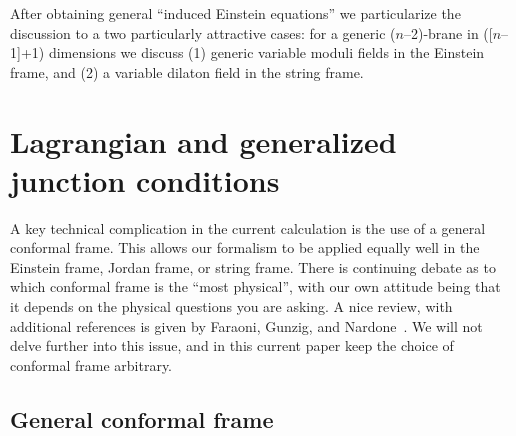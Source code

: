 \documentclass[a4paper,10pt]{article}
\begin{document}
After obtaining general ``induced Einstein equations'' we
particularize the discussion to a two particularly attractive cases:
for a generic ($n$--2)-brane in ([$n$--1]+1) dimensions we discuss (1)
generic variable moduli fields in the Einstein frame, and (2) a
variable dilaton field in the string frame.

\section{Lagrangian and generalized junction conditions}
\setcounter{equation}{0}

A key technical complication in the current calculation is the use of
a general conformal frame. This allows our formalism to be applied
equally well in the Einstein frame, Jordan frame, or string
frame. There is continuing debate as to which conformal frame is the
``most physical'', with our own attitude being that it depends on the
physical questions you are asking. A nice review, with additional
references is given by Faraoni, Gunzig, and
Nardone~\cite{conformal-frames}. We will not delve further into this
issue, and in this current paper keep the choice of conformal frame
arbitrary.


\subsection{General conformal frame}
\end{document}
